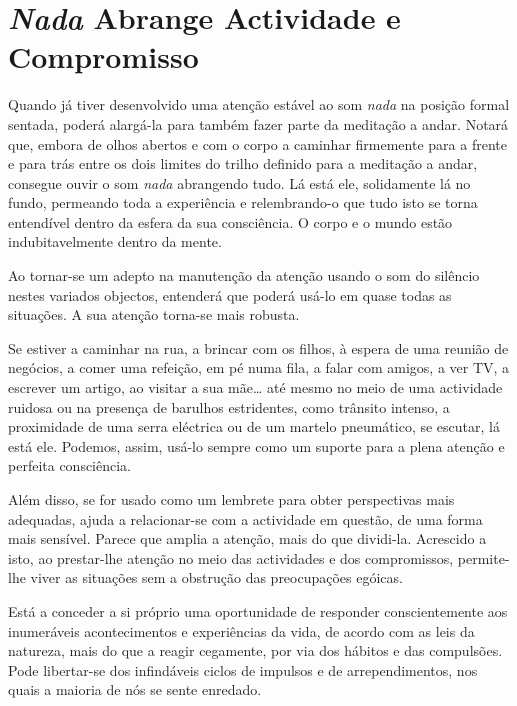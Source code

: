 \chapter{\emph{Nada} Abrange Actividade e Compromisso}

Quando já tiver desenvolvido uma atenção estável ao som \emph{nada} na
posição formal sentada, poderá alargá-la para também fazer parte da
meditação a andar. Notará que, embora de olhos abertos e com o corpo a
caminhar firmemente para a frente e para trás entre os dois limites do
trilho definido para a meditação a andar, consegue ouvir o som
\emph{nada} abrangendo tudo. Lá está ele, solidamente lá no fundo,
permeando toda a experiência e relembrando-o que tudo isto se torna
entendível dentro da esfera da sua consciência. O corpo e o mundo estão
indubitavelmente dentro da mente.

Ao tornar-se um adepto na manutenção da atenção usando o som do silêncio
nestes variados objectos, entenderá que poderá usá-lo em quase todas as
situações. A sua atenção torna-se mais robusta.

Se estiver a caminhar na rua, a brincar com os filhos, à espera de uma
reunião de negócios, a comer uma refeição, em pé numa fila, a falar com
amigos, a ver TV, a escrever um artigo, ao visitar a sua mãe\ldots{} até
mesmo no meio de uma actividade ruidosa ou na presença de barulhos
estridentes, como trânsito intenso, a proximidade de uma serra eléctrica
ou de um martelo pneumático, se escutar, lá está ele. Podemos, assim,
usá-lo sempre como um suporte para a plena atenção e perfeita
consciência.

Além disso, se for usado como um lembrete para obter perspectivas mais
adequadas, ajuda a relacionar-se com a actividade em questão, de uma
forma mais sensível. Parece que amplia a atenção, mais do que dividi-la.
Acrescido a isto, ao prestar-lhe atenção no meio das actividades e dos
compromissos, permite-lhe viver as situações sem a obstrução das
preocupações egóicas.

Está a conceder a si próprio uma oportunidade de responder
conscientemente aos inumeráveis acontecimentos e experiências da vida,
de acordo com as leis da natureza, mais do que a reagir cegamente, por
via dos hábitos e das compulsões. Pode libertar-se dos infindáveis
ciclos de impulsos e de arrependimentos, nos quais a maioria de nós se
sente enredado.

